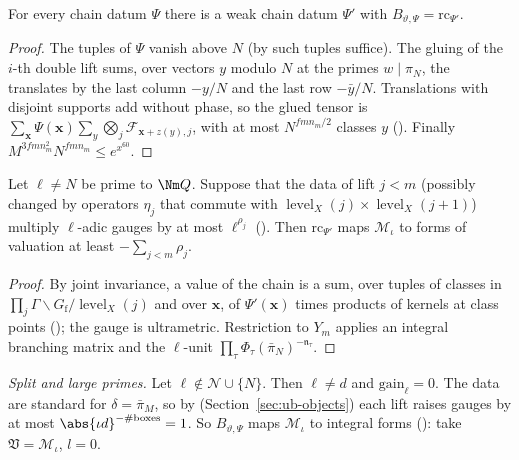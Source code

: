 \begin{lemma}
\label{ub-divis:lem:expand}
For every chain datum $\Psi$ there is a weak chain datum $\Psi'$ with $B_{\vartheta,\Psi}=\mathrm{rc}_{\Psi'}$.
\end{lemma}

\begin{proof}
The tuples of $\Psi$ vanish above $N$ (by  such
tuples suffice). The gluing of the $i$-th double lift sums, over vectors $y$
modulo $N$ at the primes $w\mid\pi_N$, the translates by the last column $-y/N$ and the last row
$-\bar y/N$. Translations with disjoint supports add without phase, so the glued tensor is
$\sum_{\mathbf x}\Psi(\mathbf x)\sum_y\bigotimes_j\mathcal F_{\mathbf x+z(y),j}$, with at most $N^{fmn_m/2}$ classes $y$
(). Finally $M^{3fmn_m^2}N^{fmn_m}\le
e^{x^{60}}$.
\end{proof}

\begin{lemma}\label{ub-divis:lem:chain}
Let $\ell\ne N$ be prime to $\Nm Q$. Suppose that the data of lift $j<m$
(possibly changed by operators $\eta_j$ that commute with $\operatorname{level}_X(j)\times\operatorname{level}_X(j+1)$) multiply $\ell$-adic gauges
by at most $\ell^{\rho_j}$ (). Then $\mathrm{rc}_{\Psi'}$ maps $\mathcal
M_\iota$ to forms of valuation at least $-\sum_{j<m}\rho_j$.
\end{lemma}

\begin{proof}
By joint invariance, a value of the chain is a sum, over tuples of classes in
$\prod_j\Gamma\backslash G_{\mathrm f}/\operatorname{level}_X(j)$ and over $\mathbf x$, of $\Psi'(\mathbf x)$ times products of kernels at class
points (); the gauge is ultrametric. Restriction to $Y_m$
applies an integral branching matrix and the $\ell$-unit $\prod_\tau\Phi_\tau(\bar\pi_N)^{-\mathfrak n_\tau}$.
\end{proof}

\emph{Split and large primes.} Let $\ell\notin\mathcal N\cup\{N\}$. Then $\ell\ne d$ and
$\mathrm{gain}_\ell=0$. The data are standard for $\delta=\bar\pi_M$, so by
 (Section~\ref{sec:ub-objects}) each lift raises
gauges by at most $\abs{\iota d}^{-\#\mathrm{boxes}}=1$. So $B_{\vartheta,\Psi}$ maps $\mathcal M_\iota$
to integral forms (): take $\mathfrak V=\mathcal
M_\iota$, $l=0$.

